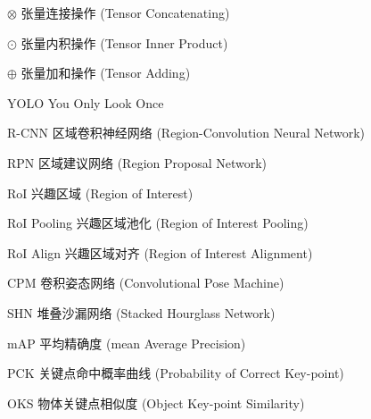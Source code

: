 \begin{denotation}[3cm]
\item[$\otimes$] 张量连接操作 (Tensor Concatenating)
\item[$\odot$] 张量内积操作 (Tensor Inner Product)
\item[$\oplus$] 张量加和操作 (Tensor Adding)
\item[YOLO] You Only Look Once
\item[R-CNN] 区域卷积神经网络 (Region-Convolution Neural Network)
\item[RPN] 区域建议网络 (Region Proposal Network)
\item[RoI] 兴趣区域 (Region of Interest)
\item[RoI Pooling] 兴趣区域池化 (Region of Interest Pooling)
\item[RoI Align] 兴趣区域对齐 (Region of Interest Alignment)
\item[CPM] 卷积姿态网络 (Convolutional Pose Machine)
\item[SHN] 堆叠沙漏网络 (Stacked Hourglass Network)
\item[mAP] 平均精确度 (mean Average Precision)
\item[PCK] 关键点命中概率曲线 (Probability of Correct Key-point)
\item[OKS] 物体关键点相似度 (Object Key-point Similarity)
\end{denotation}
